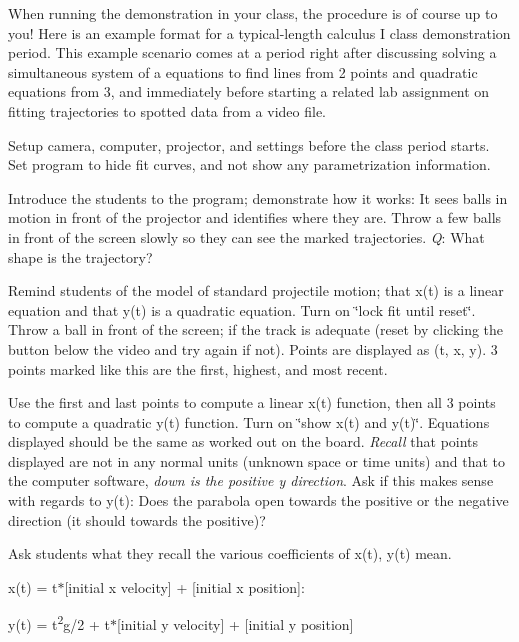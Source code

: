 When running the demonstration in your class, the procedure is of course up to you! Here is an example format for a typical-\/length calculus I class demonstration period. This example scenario comes at a period right after discussing solving a simultaneous system of a equations to find lines from 2 points and quadratic equations from 3, and immediately before starting a related lab assignment on fitting trajectories to spotted data from a video file.

Setup camera, computer, projector, and settings before the class period starts. Set program to hide fit curves, and not show any parametrization information.


\begin{DoxyEnumerate}
\item Introduce the students to the program; demonstrate how it works\+: It sees balls in motion in front of the projector and identifies where they are. Throw a few balls in front of the screen slowly so they can see the marked trajectories. {\itshape Q}\+: What shape is the trajectory?
\item Remind students of the model of standard projectile motion; that x(t) is a linear equation and that y(t) is a quadratic equation. Turn on \char`\"{}lock fit
   until reset\char`\"{}. Throw a ball in front of the screen; if the track is adequate (reset by clicking the button below the video and try again if not). Points are displayed as (t, x, y). 3 points marked like this are the first, highest, and most recent.
\item Use the first and last points to compute a linear x(t) function, then all 3 points to compute a quadratic y(t) function. Turn on \char`\"{}show x(t) and y(t)\char`\"{}. Equations displayed should be the same as worked out on the board. {\itshape Recall} that points displayed are not in any normal units (unknown space or time units) and that to the computer software, {\itshape down is the positive y direction}. Ask if this makes sense with regards to y(t)\+: Does the parabola open towards the positive or the negative direction (it should towards the positive)?
\item Ask students what they recall the various coefficients of x(t), y(t) mean.
\begin{DoxyItemize}
\item x(t) = t$\ast$\mbox{[}initial x velocity\mbox{]} + \mbox{[}initial x position\mbox{]}\+:
\item y(t) = t\textsuperscript{2}g/2 + t$\ast$\mbox{[}initial y velocity\mbox{]} + \mbox{[}initial y position\mbox{]}
\end{DoxyItemize}


\end{DoxyEnumerate}
